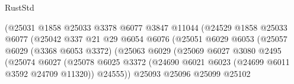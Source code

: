 \begin{lexlean}{RustStd}
\begin{coremodule}
                                            (@25031
                                              @1858
                                              @25033
                                              @3378
                                              @6077
                                              @3847
                                              @11044
                                              (@24529
                                                @1858
                                                @25033
                                                @6077
                                                (@25042
                                                  @337
                                                  @21
                                                  @29
                                                  @6054
                                                  @6076
                                                  (@25051
                                                    @6029
                                                    @6053
                                                    (@25057
                                                      @6029
                                                      (@3368 @6053 @3372)
                                                      (@25063
                                                        @6029
                                                        (@25069
                                                          @6027
                                                          @3080
                                                          @2495
                                                          (@25074
                                                            @6027
                                                            (@25078
                                                              @6025
                                                              @3372
                                                              (@24690
                                                                @6021
                                                                @6023
                                                                (@24699 @6011 @3592 @24709 @11320))
                                                              @24555))
                                                          @25093
                                                          @25096
                                                          @25099
                                                          @25102

\end{coremodule}
\end{lexlean}
